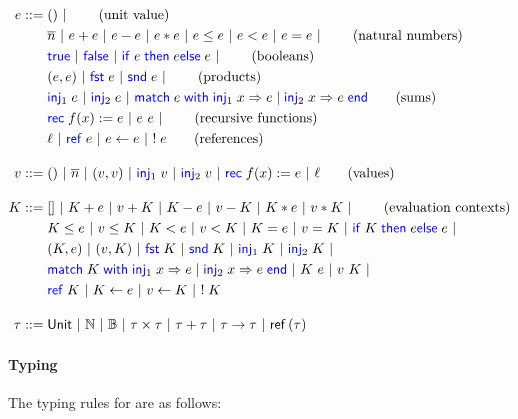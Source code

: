\documentclass[10pt]{scrartcl}
\begin{document}
\begin{align*}
  \expr \BNFdef{}
  & \TT \ALT \tag{unit value} \\
  & \Num{n} \ALT \expr + \expr \ALT \expr - \expr \ALT \expr * \expr \ALT \expr \le \expr \ALT \expr < \expr \ALT \expr = \expr \ALT \tag{natural numbers}\\
  & \True \ALT \False \ALT \If \expr then \expr \Else \expr \ALT \tag{booleans} \\
  & (\expr, \expr) \ALT \Fst \expr \ALT \Snd \expr \ALT \tag{products} \\
  & \Inj{1} \expr \ALT \Inj{2} \expr \ALT \Match \expr with \Inj{1} \var => \expr | \Inj{2} \var => \expr end \tag{sums}\\
  & \Rec f \var := \expr \ALT \expr~\expr \ALT \tag{recursive functions}\\
  & \loc \ALT \alloc \expr \ALT \expr \gets \expr \ALT \deref \expr \tag{references}\\[1em]
  \val \BNFdef{}
  & \TT \ALT \Num{n} \ALT (\val, \val) \ALT \Inj{1} \val \ALT \Inj{2} \val \ALT \Rec f \var := \expr \ALT \loc \tag{values}\\[1em]
  \elctx \BNFdef{}
  & \empelctx \ALT \elctx + \expr \ALT \val + \elctx \ALT \elctx - \expr \ALT \val - \elctx \ALT \elctx * \expr \ALT \val * \elctx \ALT \tag{evaluation contexts}\\
  & \elctx \le \expr \ALT \val \le \elctx \ALT \elctx < \expr \ALT \val < \elctx \ALT \elctx = \expr \ALT \val = \elctx \ALT \If \elctx then \expr \Else \expr \ALT \\
  & (\elctx, \expr) \ALT (\val, \elctx) \ALT \Fst \elctx \ALT \Snd \elctx \ALT \Inj{1} \elctx \ALT \Inj{2} \elctx \ALT\\
  &  \Match \elctx with \Inj{1} \var => \expr | \Inj{2} \var => \expr end \ALT
    \elctx~\expr \ALT \val~\elctx \ALT\\
  & \alloc \elctx \ALT \elctx \gets \expr \ALT \val \gets \elctx \ALT \deref \elctx \\[1em]
  \typ \BNFdef{}
  & \Tunit \ALT \Tnat \ALT \Tbool \ALT \typ \times \typ \ALT \typ + \typ \ALT \typ \to \typ \ALT \Tref{\typ}
\end{align*}

\paragraph{Typing}
The typing rules for \TheLang{} are as follows:
\end{document}
